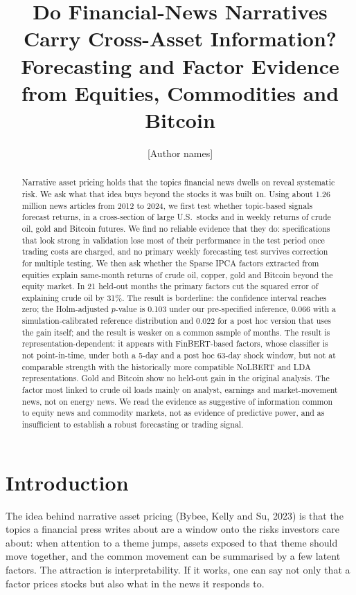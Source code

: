 \documentclass[11pt]{article}
\title{Do Financial-News Narratives Carry Cross-Asset Information?\\
Forecasting and Factor Evidence from Equities, Commodities and Bitcoin}
\author{[Author names]}
\date{}
\begin{document}
\maketitle

\begin{abstract}
\noindent Narrative asset pricing holds that the topics financial news dwells on reveal systematic risk. We ask what that idea buys beyond the stocks it was built on. Using about 1.26 million news articles from 2012 to 2024, we first test whether topic-based signals forecast returns, in a cross-section of large U.S.\ stocks and in weekly returns of crude oil, gold and Bitcoin futures. We find no reliable evidence that they do: specifications that look strong in validation lose most of their performance in the test period once trading costs are charged, and no primary weekly forecasting test survives correction for multiple testing. We then ask whether the Sparse IPCA factors extracted from equities explain same-month returns of crude oil, copper, gold and Bitcoin beyond the equity market. In 21 held-out months the primary factors cut the squared error of explaining crude oil by 31\%. The result is borderline: the confidence interval reaches zero; the Holm-adjusted $p$-value is 0.103 under our pre-specified inference, 0.066 with a simulation-calibrated reference distribution and 0.022 for a post hoc version that uses the gain itself; and the result is weaker on a common sample of months. The result is representation-dependent: it appears with FinBERT-based factors, whose classifier is not point-in-time, under both a 5-day and a post hoc 63-day shock window, but not at comparable strength with the historically more compatible NoLBERT and LDA representations. Gold and Bitcoin show no held-out gain in the original analysis. The factor most linked to crude oil loads mainly on analyst, earnings and market-movement news, not on energy news. We read the evidence as suggestive of information common to equity news and commodity markets, not as evidence of predictive power, and as insufficient to establish a robust forecasting or trading signal.
\end{abstract}

\section{Introduction}

The idea behind narrative asset pricing (Bybee, Kelly and Su, 2023) is that the topics a financial press writes about are a window onto the risks investors care about: when attention to a theme jumps, assets exposed to that theme should move together, and the common movement can be summarised by a few latent factors. The attraction is interpretability. If it works, one can say not only that a factor prices stocks but also what in the news it responds to.
\end{document}
